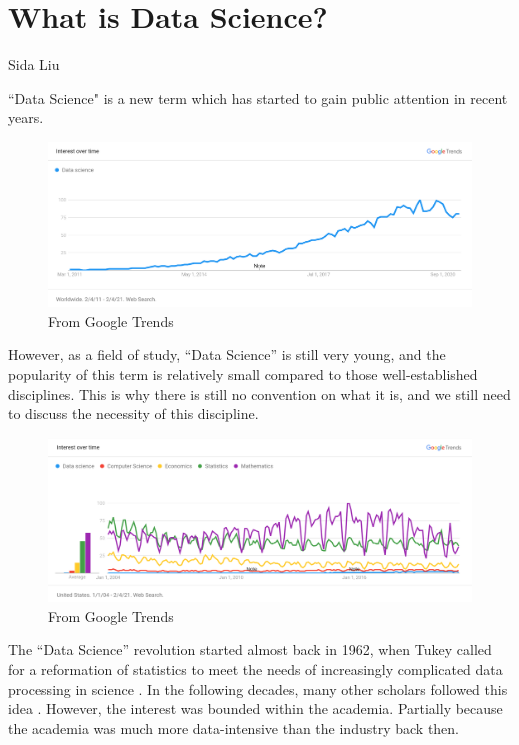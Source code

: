 \newcommand\chapternumber{1}

\usepackage{enumerate}
\usepackage{float}



\section*{What is Data Science?}
Sida Liu

``Data Science" is a new term which has started to gain public attention in recent years.

\begin{figure}[h]
    \includegraphics[width=\textwidth]{images/google_trend_1.png}
    \caption{From Google Trends \cite{Google_Trends}}
\end{figure}


However, as a field of study, ``Data Science'' is still very young, and
the popularity of this term is relatively small compared to those well-established disciplines.
This is why there is still no convention on what it is, and we still need to discuss the necessity of this discipline.

\begin{figure}[h]
    \includegraphics[width=\textwidth]{images/google_trends.png}
    \caption{From Google Trends \cite{Google_Trends}}
\end{figure}

\newpage
The ``Data Science'' revolution started almost back in 1962, when Tukey called for a reformation of statistics to meet the needs of increasingly complicated data processing in science \cite{tukey_future_1962}.
In the following decades, many other scholars followed this idea \cite{donoho_50_2017}.
However, the interest was bounded within the academia.
Partially because the academia was much more data-intensive than the industry back then.

